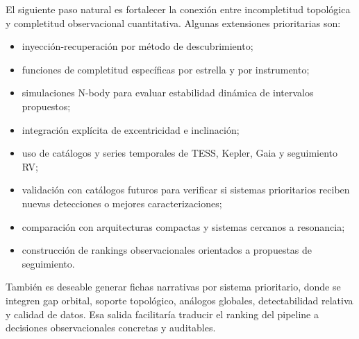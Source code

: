 El siguiente paso natural es fortalecer la conexi\'on entre incompletitud topol\'ogica y completitud observacional cuantitativa. Algunas extensiones prioritarias son:

\begin{itemize}
\item inyecci\'on-recuperaci\'on por m\'etodo de descubrimiento;
\item funciones de completitud espec\'ificas por estrella y por instrumento;
\item simulaciones N-body para evaluar estabilidad din\'amica de intervalos propuestos;
\item integraci\'on expl\'icita de excentricidad e inclinaci\'on;
\item uso de cat\'alogos y series temporales de TESS, Kepler, Gaia y seguimiento RV;
\item validaci\'on con cat\'alogos futuros para verificar si sistemas prioritarios reciben nuevas detecciones o mejores caracterizaciones;
\item comparaci\'on con arquitecturas compactas y sistemas cercanos a resonancia;
\item construcci\'on de rankings observacionales orientados a propuestas de seguimiento.
\end{itemize}

Tambi\'en es deseable generar fichas narrativas por sistema prioritario, donde se integren gap orbital, soporte topol\'ogico, an\'alogos globales, detectabilidad relativa y calidad de datos. Esa salida facilitar\'ia traducir el ranking del pipeline a decisiones observacionales concretas y auditables.
